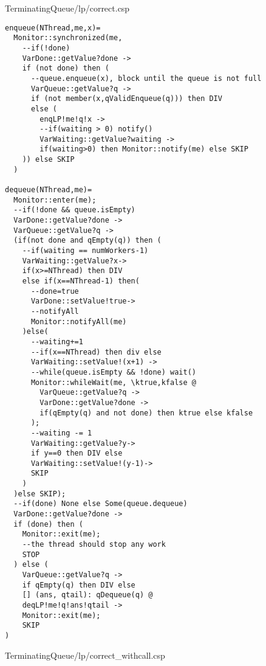 TerminatingQueue/lp/correct.csp
\begin{lstlisting}
enqueue(NThread,me,x)=
  Monitor::synchronized(me,
    --if(!done)
    VarDone::getValue?done ->
    if (not done) then (
      --queue.enqueue(x), block until the queue is not full
      VarQueue::getValue?q ->
      if (not member(x,qValidEnqueue(q))) then DIV
      else (
        enqLP!me!q!x ->
        --if(waiting > 0) notify()
        VarWaiting::getValue?waiting ->
        if(waiting>0) then Monitor::notify(me) else SKIP
    )) else SKIP
  )
  
dequeue(NThread,me)=
  Monitor::enter(me);
  --if(!done && queue.isEmpty)
  VarDone::getValue?done ->
  VarQueue::getValue?q ->
  (if(not done and qEmpty(q)) then (
    --if(waiting == numWorkers-1)
    VarWaiting::getValue?x->
    if(x>=NThread) then DIV
    else if(x==NThread-1) then(
      --done=true
      VarDone::setValue!true->
      --notifyAll
      Monitor::notifyAll(me)
    )else(
      --waiting+=1
      --if(x==NThread) then div else
      VarWaiting::setValue!(x+1) ->
      --while(queue.isEmpty && !done) wait()
      Monitor::whileWait(me, \ktrue,kfalse @
        VarQueue::getValue?q ->
        VarDone::getValue?done ->
        if(qEmpty(q) and not done) then ktrue else kfalse
      );
      --waiting -= 1
      VarWaiting::getValue?y->
      if y==0 then DIV else 
      VarWaiting::setValue!(y-1)->
      SKIP
    )
  )else SKIP);
  --if(done) None else Some(queue.dequeue)
  VarDone::getValue?done ->
  if (done) then (
    Monitor::exit(me);
    --the thread should stop any work
    STOP
  ) else (
    VarQueue::getValue?q ->
    if qEmpty(q) then DIV else
    [] (ans, qtail): qDequeue(q) @
    deqLP!me!q!ans!qtail ->
    Monitor::exit(me);
    SKIP
)
\end{lstlisting}
TerminatingQueue/lp/correct\_withcall.csp
